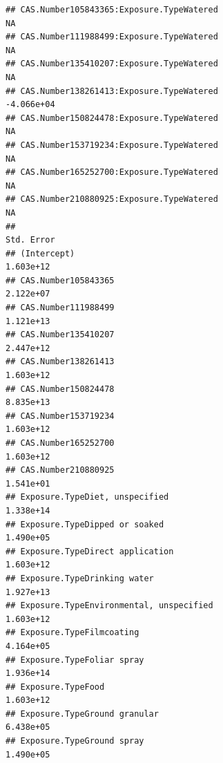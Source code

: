 \documentclass[
  12pt,
]{article}
\begin{document}
\begin{verbatim}
## CAS.Number105843365:Exposure.TypeWatered                                                NA
## CAS.Number111988499:Exposure.TypeWatered                                                NA
## CAS.Number135410207:Exposure.TypeWatered                                                NA
## CAS.Number138261413:Exposure.TypeWatered                                        -4.066e+04
## CAS.Number150824478:Exposure.TypeWatered                                                NA
## CAS.Number153719234:Exposure.TypeWatered                                                NA
## CAS.Number165252700:Exposure.TypeWatered                                                NA
## CAS.Number210880925:Exposure.TypeWatered                                                NA
##                                                                                 Std. Error
## (Intercept)                                                                      1.603e+12
## CAS.Number105843365                                                              2.122e+07
## CAS.Number111988499                                                              1.121e+13
## CAS.Number135410207                                                              2.447e+12
## CAS.Number138261413                                                              1.603e+12
## CAS.Number150824478                                                              8.835e+13
## CAS.Number153719234                                                              1.603e+12
## CAS.Number165252700                                                              1.603e+12
## CAS.Number210880925                                                              1.541e+01
## Exposure.TypeDiet, unspecified                                                   1.338e+14
## Exposure.TypeDipped or soaked                                                    1.490e+05
## Exposure.TypeDirect application                                                  1.603e+12
## Exposure.TypeDrinking water                                                      1.927e+13
## Exposure.TypeEnvironmental, unspecified                                          1.603e+12
## Exposure.TypeFilmcoating                                                         4.164e+05
## Exposure.TypeFoliar spray                                                        1.936e+14
## Exposure.TypeFood                                                                1.603e+12
## Exposure.TypeGround granular                                                     6.438e+05
## Exposure.TypeGround spray                                                        1.490e+05

\end{verbatim}
\end{document}
